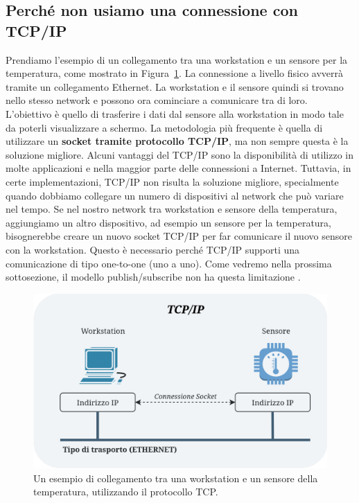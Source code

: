 \subsection{Perché non usiamo una connessione con TCP/IP}
Prendiamo l'esempio di un collegamento tra una workstation e 
un sensore per la temperatura, come mostrato in 
Figura~\ref{TCP connection}. La connessione a livello fisico
avverrà tramite un collegamento Ethernet. La workstation e il 
sensore quindi si trovano nello stesso network e possono 
ora cominciare a comunicare tra di loro. L'obiettivo è quello
di trasferire i dati dal sensore alla workstation in modo tale
da poterli visualizzare a schermo.
La metodologia più frequente è quella di utilizzare un 
\textbf{socket tramite 
protocollo TCP/IP}, ma non sempre questa è la soluzione migliore.
Alcuni vantaggi del TCP/IP sono la disponibilità di utilizzo 
in molte applicazioni e nella maggior parte 
delle connessioni a Internet.
Tuttavia, in certe implementazioni, TCP/IP non risulta la soluzione migliore,
specialmente quando dobbiamo collegare un numero di dispositivi al 
network che può variare nel tempo. Se nel nostro network tra workstation e 
sensore della temperatura, aggiungiamo un altro dispositivo, ad esempio un 
sensore per la temperatura, bisognerebbe creare un nuovo socket 
TCP/IP per far comunicare il nuovo sensore con la workstation.
Questo è necessario perché TCP/IP supporti una comunicazione di tipo 
one-to-one (uno a uno). Come vedremo nella prossima sottosezione,
il modello publish/subscribe non ha questa limitazione \cite{1494965}.



\begin{figure}[H]
    \centering
    \includegraphics[width=12cm, keepaspectratio]{img/TCP connessione-Pagina-2.jpg}
    \caption{Un esempio di collegamento tra una workstation e un sensore della temperatura,
    utilizzando il protocollo TCP.}
    \label{TCP connection}
\end{figure}



